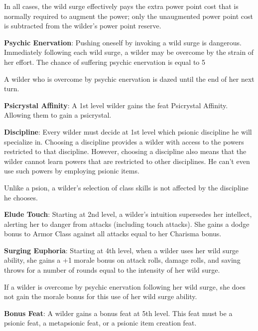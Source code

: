In all cases, the wild surge effectively pays the extra power point cost that is normally required to augment the power; only the unaugmented power point cost is subtracted from the wilder’s power point reserve.

\textbf{Psychic Enervation}: Pushing oneself by invoking a wild surge is dangerous. Immediately following each wild surge, a wilder may be overcome by the strain of her effort. The chance of suffering psychic enervation is equal to 5%

A wilder who is overcome by psychic enervation is dazed until the end of her next turn.

\textbf{Psicrystal Affinity}: A 1st level wilder gains the feat Psicrystal Affinity. Allowing them to gain a psicrystal.

\textbf{Discipline}: Every wilder must decide at 1st level which psionic discipline he will specialize in. Choosing a discipline provides a wilder with access to the powers restricted to that discipline. However, choosing a discipline also means that the wilder cannot learn powers that are restricted to other disciplines. He can’t even use such powers by employing psionic items.

Unlike a psion, a wilder's selection of class skills is not affected by the discipline he chooses.

\textbf{Elude Touch}: Starting at 2nd level, a wilder’s intuition supersedes her intellect, alerting her to danger from attacks (including touch attacks). She gains a dodge bonus to Armor Class against all attacks equal to her Charisma bonus.

\textbf{Surging Euphoria}: Starting at 4th level, when a wilder uses her wild surge ability, she gains a +1 morale bonus on attack rolls, damage rolls, and saving throws for a number of rounds equal to the intensity of her wild surge.

If a wilder is overcome by psychic enervation following her wild surge, she does not gain the morale bonus for this use of her wild surge ability.

\textbf{Bonus Feat}: A wilder gains a bonus feat at 5th level. This feat must be a psionic feat, a metapsionic feat, or a psionic item creation feat.